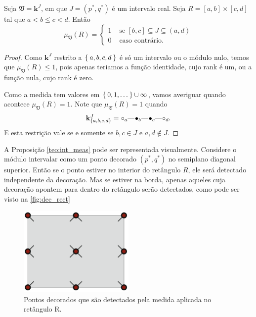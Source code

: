 \begin{propo}\label{teo:int_meas}
    Seja $\mathfrak{V} = \mathbf{k}^J$, em que $J=(p^*, q^*)$ é um intervalo real. Seja $R=[a,b]\times[c,d]$
    tal que $a < b \leq c < d$. Então
    \begin{equation*}
        \mu_{\mathfrak{V}}(R) = \left\{
        \begin{split}
            1 & \text{ se } [b,c] \subseteq J \subseteq (a,d) \\
            0 & \text{ caso contrário.}
        \end{split}
        \right.
    \end{equation*}
\end{propo} 
\begin{proof}
    Como $\mathbf{k}^J$ restrito a $\Set{a,b,c,d}$ é só um intervalo ou o módulo nulo, temos que $\mu_{\mathfrak{V}}(R)
    \leq 1$, pois apenas teriamos a função identidade, cujo rank é um, ou a função nula, cujo rank é zero. 

    Como a medida tem valores em $\Set{0,1,\dots} \cup {\infty}$, vamos averiguar quando acontece $\mu_{\mathfrak{V}}(R)
    = 1$. Note que $\mu_{\mathfrak{V}}(R) = 1$ quando 
    \begin{equation*}    
        \mathbf{k}^J_{\{a,b,c,d\}} = \qoff{a} \qem \qon{b} \qem \qon{c} \qem \qoff{d}. 
    \end{equation*}
    E esta restrição vale se e somente se $b,c \in J$ e $a,d \nin J$.
\end{proof}

A Proposição \ref{teo:int_meas} pode ser representada visualmente. Considere o módulo intervalar como um ponto
decorado $(p^*, q^*)$ no semiplano diagonal superior. Então se o ponto estiver no interior do retângulo
$R$, ele será detectado independente da decoração. Mas se estiver na borda, apenas aqueles cuja decoração
apontem para dentro do retângulo serão detectados, como pode ser visto na \autoref{fig:dec_rect}
\begin{figure}[htpb!]
    \centering
    \includegraphics[width=0.5\textwidth]{images/rect_points.png}
    \caption{Pontos decorados que são detectados pela medida aplicada no retângulo R.}
    \label{fig:dec_rect}
\end{figure}

